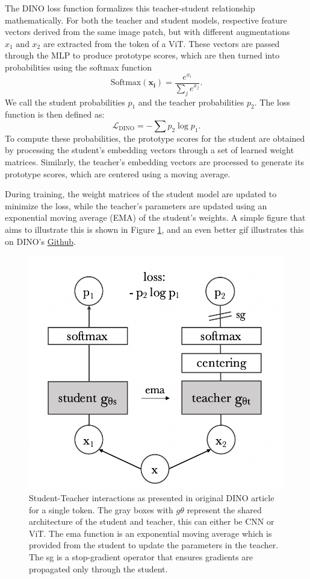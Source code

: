 %
The DINO loss function formalizes this teacher-student relationship mathematically. For both the teacher and student models, respective feature vectors derived from the same image patch, but with different augmentations $x_1 \text{ and } x_2$ are extracted from the token of a ViT. These vectors are passed through the MLP to produce prototype scores, which are then turned into probabilities using the softmax function
\begin{equation}
\text{Softmax}(\mathbf{x_i}) = \frac{e^{x_i}}{\sum_{j} e^{x_j}}.
\end{equation}
We call the student probabilities \( p_1 \) and the teacher probabilities \( p_2 \). The loss function is then defined as:
\[
\mathcal{L}_{\text{DINO}} = -\sum p_2 \log p_1.
\]
To compute these probabilities, the prototype scores for the student are obtained by processing the student’s embedding vectors through a set of learned weight matrices. Similarly, the teacher’s embedding vectors are processed to generate its prototype scores, which are centered using a moving average. 

During training, the weight matrices of the student model are updated to minimize the loss, while the teacher’s parameters are updated using an exponential moving average (EMA) of the student’s weights. A simple figure that aims to illustrate this is shown in Figure \ref{fig:dino}, and an even better gif illustrates this on DINO's \hyperlink{https://github.com/facebookresearch/dino}{Github}.
%
%
%
\begin{figure}[H]
    \centering
    \includegraphics[width=0.7\linewidth]{examples/tests_eb/figs/dino.png}
    \caption{Student-Teacher interactions as presented in original DINO article \cite{dino1} for a single token. The gray boxes with $g\theta$ represent the shared architecture of the student and teacher, this can either be CNN or ViT. The ema function is an exponential moving average which is provided from the student to update the parameters in the teacher. The sg is a stop-gradient operator that ensures gradients are propagated only through the student.}
    \label{fig:dino}
\end{figure}
%
%


